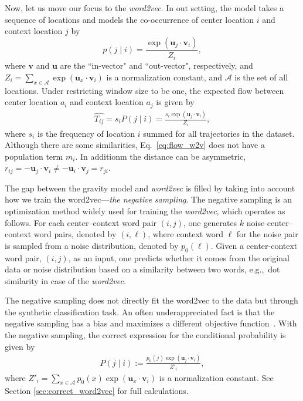 \documentclass[12pt]{article} %
\def\given{\mid}
\def\eg{e.g.,~}
\begin{document}
Now, let us move our focus to the \textit{word2vec}.
In out setting, the model takes a sequence of locations and models the co-occurrence of center location $i$ and context location $j$ by
\begin{equation}
    p(j \given i) = \frac{\exp(\bm{u}_j \cdot \bm{v}_{i})}{Z_i},
\end{equation}
where $\bm{v}$ and $\bm{u}$ are the ``in-vector" and ``out-vector", respectively, and $Z_i=\sum_{x \in \mathcal{A}} \exp(\bm{u}_{x} \cdot \bm{v}_{i})$ is a normalization constant,
and $\mathcal{A}$ is the set of all locations.
Under restricting window size to be one, the expected flow between center location $a_i$ and context location $a_j$ is given by
\begin{align}
    \label{eq:flow_w2v}
    \hat{T_{ij}}=s_i P(j\given i) = \frac{s_i\exp(\bm{u}_j \cdot \bm{v}_{i})}{Z_i},
\end{align}
where $s_i$ is the frequency of location $i$ summed for all trajectories in the dataset.
Although there are some similarities, Eq.~\ref{eq:flow_w2v} does not have a population term $m_i$. In additionm the distance can be asymmetric,$r_{ij}=- \bm{u}_{j} \cdot \bm{v}_{i} \neq - \bm{u}_{i} \cdot \bm{v}_{j}=r_{ji}$.

The gap between the gravity model and {\it word2vec} is filled by taking into account how we train the word2vec---\emph{the negative sampling}.
The negative sampling is an optimization method widely used for training the \textit{word2vec}, which operates as follows.
For each center--context word pair $(i,j)$, one generates $k$ noise center--context word pairs, denoted by $(i, \ell)$, where context word $\ell$ for the noise pair is sampled from a noise distribution, denoted by $p_{0}(\ell)$.
Given a center-context word pair, $(i,j)$, as an input, one predicts whether it comes from the original data or noise distribution based on a similarity between two words, \eg dot similarity in case of the \textit{word2vec}.

The negative sampling does not directly fit the word2vec to the data but through the synthetic classification task.
An often underappreciated fact is that the negative sampling has a bias and maximizes a different objective function~\autocite{Gutmann2010}.
With the negative sampling, the correct expression for the conditional probability is given by
\begin{align}
    P\left(j \given i \right):= \frac{p_0(j)\exp(\bm{u}_j \cdot \bm{v}_{i})}{Z'_i}, \label{eq:prob_w2v_ng0}
\end{align}
where $Z'_i=\sum_{x \in \mathcal{A}} p_0(x) \exp(\bm{u}_{x} \cdot \bm{v}_{i})$ is a normalization constant.
See Section \ref{sec:correct_word2vec} for full calculations.
\end{document}
